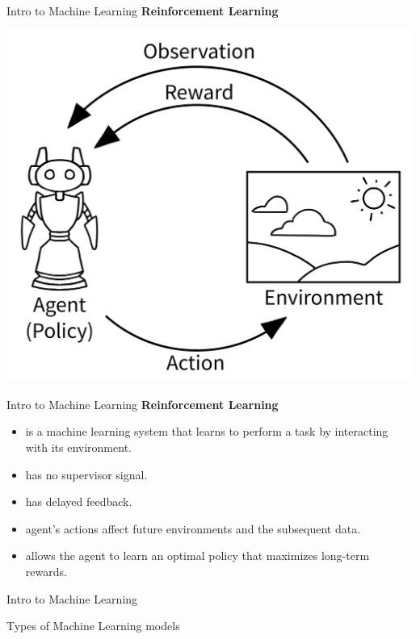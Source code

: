 \documentclass{beamer}
\begin{document}
\begin{frame}[fragile]{Intro to Machine Learning}
    \textbf{Reinforcement Learning}
    \begin{center}
        \includegraphics[width=\textwidth,height=0.6\textheight,keepaspectratio]{figures/RL.png}
    \end{center}
\end{frame}
\begin{frame}[fragile]{Intro to Machine Learning}
    \textbf{Reinforcement Learning}
    \begin{itemize}
        \item is a machine learning system that learns to perform a task by interacting with its environment.
        \item has no supervisor signal.
        \item has delayed feedback.
        \item agent's actions affect future environments and the subsequent data.
        \item allows the agent to learn an optimal policy that maximizes long-term rewards.
    \end{itemize}
\end{frame}
\begin{frame}[fragile]{Intro to Machine Learning}
    \begin{center}
        \Huge Types of Machine Learning models
    \end{center}            
\end{frame}
\end{document}
